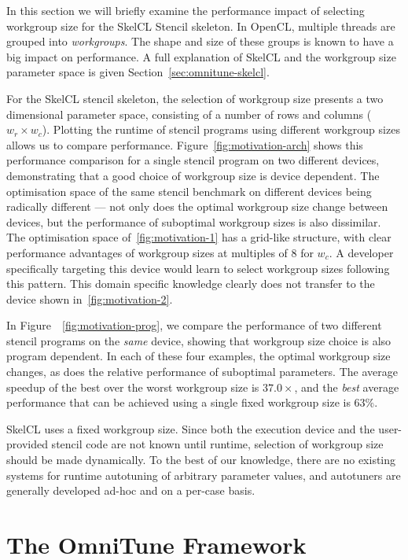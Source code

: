 \documentclass[nonatbib,preprint,9pt]{sigplanconf}
\begin{document}
In this section we will briefly examine the performance impact of
selecting workgroup size for the SkelCL Stencil skeleton. In OpenCL,
multiple threads are grouped into \emph{workgroups}. The shape and
size of these groups is known to have a big impact on performance. A
full explanation of SkelCL and the workgroup size parameter space is
given Section~\ref{sec:omnitune-skelcl}.

For the SkelCL stencil skeleton, the selection of workgroup size
presents a two dimensional parameter space, consisting of a number of
rows and columns ($w_r \times w_c$).  Plotting the runtime of stencil
programs using different workgroup sizes allows us to compare
performance. Figure~\ref{fig:motivation-arch} shows this performance
comparison for a single stencil program on two different devices,
demonstrating that a good choice of workgroup size is device
dependent. The optimisation space of the same stencil benchmark on
different devices being radically different --- not only does the
optimal workgroup size change between devices, but the performance of
suboptimal workgroup sizes is also dissimilar. The optimisation space
of~\ref{fig:motivation-1} has a grid-like structure, with clear
performance advantages of workgroup sizes at multiples of 8 for
$w_c$. A developer specifically targeting this device would learn to
select workgroup sizes following this pattern. This domain specific
knowledge clearly does not transfer to the device shown
in~\ref{fig:motivation-2}.

In Figure~~\ref{fig:motivation-prog}, we compare the performance of
two different stencil programs on the \emph{same} device, showing that
workgroup size choice is also program dependent. In each of these four
examples, the optimal workgroup size changes, as does the relative
performance of suboptimal parameters. The average speedup of the best
over the worst workgroup size is $37.0\times$, and the \emph{best}
average performance that can be achieved using a single fixed
workgroup size is 63\%.

SkelCL uses a fixed workgroup size. Since both the execution device
and the user-provided stencil code are not known until runtime,
selection of workgroup size should be made dynamically. To the best of
our knowledge, there are no existing systems for runtime autotuning of
arbitrary parameter values, and autotuners are generally developed
ad-hoc and on a per-case basis.


\section{The OmniTune Framework}\label{sec:autotune}
\end{document}
